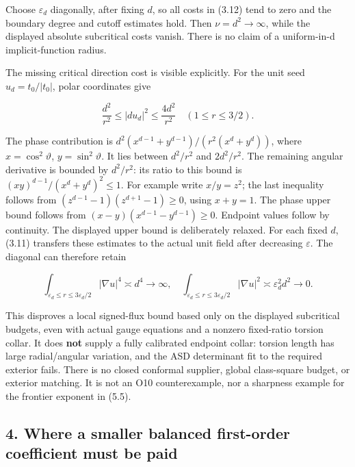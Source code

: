 \documentclass[
  11pt,
]{article}
\begin{document}
Choose \(\varepsilon_d\) diagonally, after fixing \(d\), so all costs in
(3.12) tend to zero and the boundary degree and cutoff estimates hold.
Then \(\nu=d^2\to\infty\), while the displayed absolute subcritical
costs vanish. There is no claim of a uniform-in-d implicit-function
radius.

The missing critical direction cost is visible explicitly. For the unit
seed \(u_d=t_0/|t_0|\), polar coordinates give

\[
 \frac{d^2}{r^2}\le|du_d|^2\le\frac{4d^2}{r^2}
                   \quad(1\le r\le3/2).
 \tag{3.13}
\]

The phase contribution is \(d^2(x^{d-1}+y^{d-1})/(r^2(x^d+y^d))\), where
\(x=\cos^2\vartheta\), \(y=\sin^2\vartheta\). It lies between
\(d^2/r^2\) and \(2d^2/r^2\). The remaining angular derivative is
bounded by \(d^2/r^2\): its ratio to this bound is
\((xy)^{d-1}/(x^d+y^d)^2\le1\). For example write \(x/y=z^2\); the last
inequality follows from \((z^{d-1}-1)(z^{d+1}-1)\ge0\), using \(x+y=1\).
The phase upper bound follows from \((x-y)(x^{d-1}-y^{d-1})\ge0\).
Endpoint values follow by continuity. The displayed upper bound is
deliberately relaxed. For each fixed \(d\), (3.11) transfers these
estimates to the actual unit field after decreasing \(\varepsilon\). The
diagonal can therefore retain

\[
 \int_{\varepsilon_d\le r\le3\varepsilon_d/2}|\nabla u|^4
                    \asymp d^4\longrightarrow\infty,
 \quad
 \int_{\varepsilon_d\le r\le3\varepsilon_d/2}|\nabla u|^2
                    \asymp\varepsilon_d^2d^2\longrightarrow0.
 \tag{3.14}
\]

This disproves a local signed-flux bound based only on the displayed
subcritical budgets, even with actual gauge equations and a nonzero
fixed-ratio torsion collar. It does \textbf{not} supply a fully
calibrated endpoint collar: torsion length has large radial/angular
variation, and the ASD determinant fit to the required exterior fails.
There is no closed conformal supplier, global class-square budget, or
exterior matching. It is not an O10 counterexample, nor a sharpness
example for the frontier exponent in (5.5).

\hypertarget{where-a-smaller-balanced-first-order-coefficient-must-be-paid}{%
\subsection{4. Where a smaller balanced first-order coefficient must be
paid}\label{where-a-smaller-balanced-first-order-coefficient-must-be-paid}}
\end{document}
